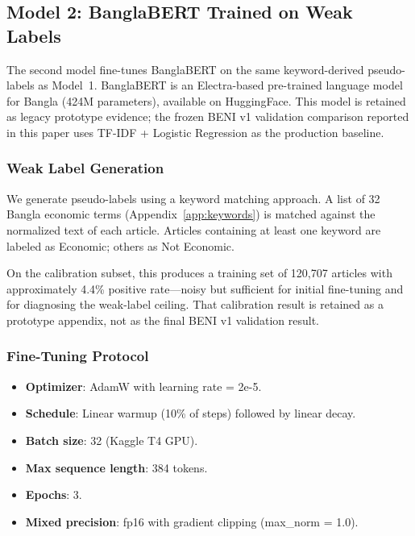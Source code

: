 \subsection{Model 2: BanglaBERT Trained on Weak Labels}

The second model fine-tunes BanglaBERT \citep{chowdhury2020banglabert} on the same keyword-derived pseudo-labels as Model~1. BanglaBERT is an Electra-based pre-trained language model for Bangla (424M parameters), available on HuggingFace. This model is retained as legacy prototype evidence; the frozen BENI v1 validation comparison reported in this paper uses TF-IDF + Logistic Regression as the production baseline.

\subsubsection{Weak Label Generation}

We generate pseudo-labels using a keyword matching approach. A list of 32 Bangla economic terms (Appendix~\ref{app:keywords}) is matched against the normalized text of each article. Articles containing at least one keyword are labeled as Economic; others as Not Economic.

On the calibration subset, this produces a training set of 120,707 articles with approximately 4.4\% positive rate---noisy but sufficient for initial fine-tuning and for diagnosing the weak-label ceiling. That calibration result is retained as a prototype appendix, not as the final BENI v1 validation result.

\subsubsection{Fine-Tuning Protocol}

\begin{itemize}
    \item \textbf{Optimizer}: AdamW with learning rate = 2e-5.
    \item \textbf{Schedule}: Linear warmup (10\% of steps) followed by linear decay.
    \item \textbf{Batch size}: 32 (Kaggle T4 GPU).
    \item \textbf{Max sequence length}: 384 tokens.
    \item \textbf{Epochs}: 3.
    \item \textbf{Mixed precision}: fp16 with gradient clipping (max\_norm = 1.0).
\end{itemize}


